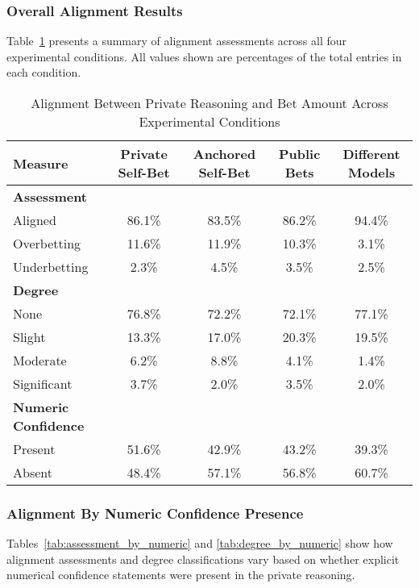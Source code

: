 \documentclass{article}
\begin{document}
\subsubsection{Overall Alignment Results}
\label{appendix:overall_alignment}

Table~\ref{tab:alignment_comparison} presents a summary of alignment assessments across all four experimental conditions. All values shown are percentages of the total entries in each condition.

\begin{table}[htbp]
\centering
\caption{Alignment Between Private Reasoning and Bet Amount Across Experimental Conditions}
\label{tab:alignment_comparison}
\begin{tabular}{lcccc}
\toprule
\textbf{Measure} & \textbf{Private Self-Bet} & \textbf{Anchored Self-Bet} & \textbf{Public Bets} & \textbf{Different Models} \\
\midrule
\textbf{Assessment} & & & & \\
Aligned & 86.1\% & 83.5\% & 86.2\% & 94.4\% \\
Overbetting & 11.6\% & 11.9\% & 10.3\% & 3.1\% \\
Underbetting & 2.3\% & 4.5\% & 3.5\% & 2.5\% \\
\midrule
\textbf{Degree} & & & & \\
None & 76.8\% & 72.2\% & 72.1\% & 77.1\% \\
Slight & 13.3\% & 17.0\% & 20.3\% & 19.5\% \\
Moderate & 6.2\% & 8.8\% & 4.1\% & 1.4\% \\
Significant & 3.7\% & 2.0\% & 3.5\% & 2.0\% \\
\midrule
\textbf{Numeric Confidence} & & & & \\
Present & 51.6\% & 42.9\% & 43.2\% & 39.3\% \\
Absent & 48.4\% & 57.1\% & 56.8\% & 60.7\% \\
\bottomrule
\end{tabular}
\end{table}

\subsubsection{Alignment By Numeric Confidence Presence}
\label{appendix:alignment_by_numeric}

Tables~\ref{tab:assessment_by_numeric} and \ref{tab:degree_by_numeric} show how alignment assessments and degree classifications vary based on whether explicit numerical confidence statements were present in the private reasoning.
\end{document}
